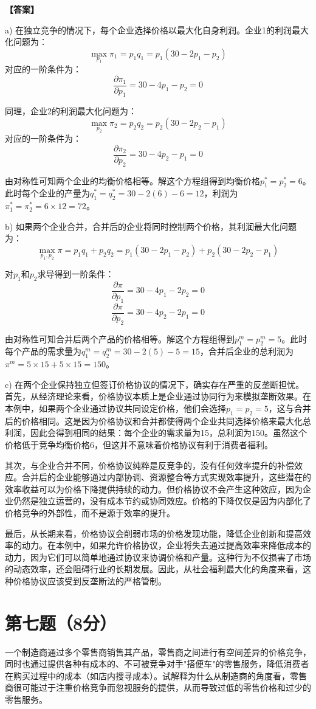 \documentclass[12pt]{article}
\begin{document}
\noindent\textbf{【答案】}

a) 在独立竞争的情况下，每个企业选择价格以最大化自身利润。企业1的利润最大化问题为：
\[\max_{p_1} \pi_1 = p_1q_1 = p_1(30-2p_1-p_2)\]
对应的一阶条件为：
\[\frac{\partial \pi_1}{\partial p_1} = 30-4p_1-p_2 = 0\]

同理，企业2的利润最大化问题为：
\[\max_{p_2} \pi_2 = p_2q_2 = p_2(30-2p_2-p_1)\]
对应的一阶条件为：
\[\frac{\partial \pi_2}{\partial p_2} = 30-4p_2-p_1 = 0\]

由对称性可知两个企业的均衡价格相等。解这个方程组得到均衡价格$p_1^* = p_2^* = 6$。此时每个企业的产量为$q_1^* = q_2^* = 30-2(6)-6 = 12$，利润为$\pi_1^* = \pi_2^* = 6 \times 12 = 72$。

b) 如果两个企业合并，合并后的企业将同时控制两个价格，其利润最大化问题为：
\[\max_{p_1,p_2} \pi = p_1q_1 + p_2q_2 = p_1(30-2p_1-p_2) + p_2(30-2p_2-p_1)\]

对$p_1$和$p_2$求导得到一阶条件：
\[\frac{\partial \pi}{\partial p_1} = 30-4p_1-2p_2 = 0\]
\[\frac{\partial \pi}{\partial p_2} = 30-4p_2-2p_1 = 0\]

由对称性可知合并后两个产品的价格相等。解这个方程组得到$p_1^m = p_2^m = 5$。此时每个产品的需求量为$q_1^m = q_2^m = 30-2(5)-5 = 15$，合并后企业的总利润为$\pi^m = 5 \times 15 + 5 \times 15 = 150$。

c) 在两个企业保持独立但签订价格协议的情况下，确实存在严重的反垄断担忧。首先，从经济理论来看，价格协议本质上是企业通过协同行为来模拟垄断效果。在本例中，如果两个企业通过协议共同设定价格，他们会选择$p_1 = p_2 = 5$，这与合并后的价格相同。这是因为价格协议和合并都使得两个企业共同选择价格来最大化总利润，因此会得到相同的结果：每个企业的需求量为15，总利润为150。虽然这个价格低于竞争均衡价格6，但这并不意味着价格协议有利于消费者福利。

其次，与企业合并不同，价格协议纯粹是反竞争的，没有任何效率提升的补偿效应。合并后的企业能够通过内部协调、资源整合等方式实现效率提升，这些潜在的效率收益可以为价格下降提供持续的动力。但价格协议不会产生这种效应，因为企业仍然是独立运营的，没有成本节约或协同效应。价格的下降仅仅是因为内部化了价格竞争的外部性，而不是源于效率的提升。

最后，从长期来看，价格协议会削弱市场的价格发现功能，降低企业创新和提高效率的动力。在本例中，如果允许价格协议，企业将失去通过提高效率来降低成本的动力，因为它们可以简单地通过协议来协调价格和产量。这种行为不仅损害了市场的动态效率，还会阻碍行业的长期发展。因此，从社会福利最大化的角度来看，这种价格协议应该受到反垄断法的严格管制。

\section*{第七题（8分）}
一个制造商通过多个零售商销售其产品，零售商之间进行有空间差异的价格竞争，同时也通过提供各种有成本的、不可被竞争对手"搭便车"的零售服务，降低消费者在购买过程中的成本（如店内搜寻成本）。试解释为什么从制造商的角度看，零售商很可能过于注重价格竞争而忽视服务的提供，从而导致过低的零售价格和过少的零售服务。
\end{document}
